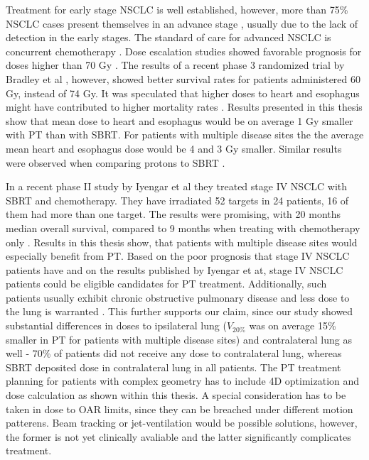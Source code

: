 Treatment for early stage NSCLC is well established, however, more than 75\% NSCLC cases present themselves in an advance stage \cite{Jemal2009}, 
usually due to the lack of detection in the early stages. The standard of care for advanced NSCLC is concurrent chemotherapy \cite{Oshiro2014}.
Dose escalation studies showed favorable prognosis for doses higher than 70 Gy \cite{Hayman2001, Rosenman2002, Socinski2008}. 
The results of a recent phase 3 randomized trial by Bradley et al \cite{Bradley2010}, however, showed better survival rates for patients administered 60 Gy,
instead of 74 Gy. It was speculated that higher doses to heart and esophagus might have contributed to higher mortality rates \cite{Cox2012}. 
Results presented in this thesis show that mean dose to heart and esophagus would be on average 1 Gy
smaller with PT than with SBRT. For patients with multiple disease sites the the average mean heart and esophagus dose would be 4 and 3 Gy smaller.
Similar results were observed when comparing protons to SBRT \cite{Georg2008}. 

In a recent phase II study by Iyengar et al \cite{Iyengar2014} they treated stage IV NSCLC with SBRT and chemotherapy. 
They have irradiated 52 targets in 24 patients, 16 of them had more than one target. The results were promising, with 20 months median overall survival, 
compared to 9 months when treating with chemotherapy only \cite{Tsao2008}. Results in this thesis show, that patients with multiple disease sites 
would especially benefit from PT. Based on the poor prognosis that stage IV NSCLC patients have and on the results published by Iyengar et at,
stage IV NSCLC patients could be eligible candidates for PT treatment. Additionally, such patients usually exhibit chronic obstructive pulmonary disease and 
less dose to the lung is warranted \cite{Westover2012}. This further supports our claim, since our study showed substantial differences in 
doses to ipsilateral lung ($V_{20\%}$ was on average 15\% smaller in PT for patients with multiple disease sites) and 
contralateral lung as well - 70\% of patients did not receive any dose to contralateral lung, whereas SBRT deposited dose in contralateral lung in all patients.
The PT treatment planning for patients with complex geometry has to include 4D optimization and dose calculation as shown within this thesis. 
A special consideration has to be taken in dose to OAR limits, since they can be breached under different motion patterens.
Beam tracking \cite{Bert2007} or jet-ventilation \cite{Santiago2013} would be possible solutions, however, the former is not yet clinically avaliable and the latter 
significantly complicates treatment.

